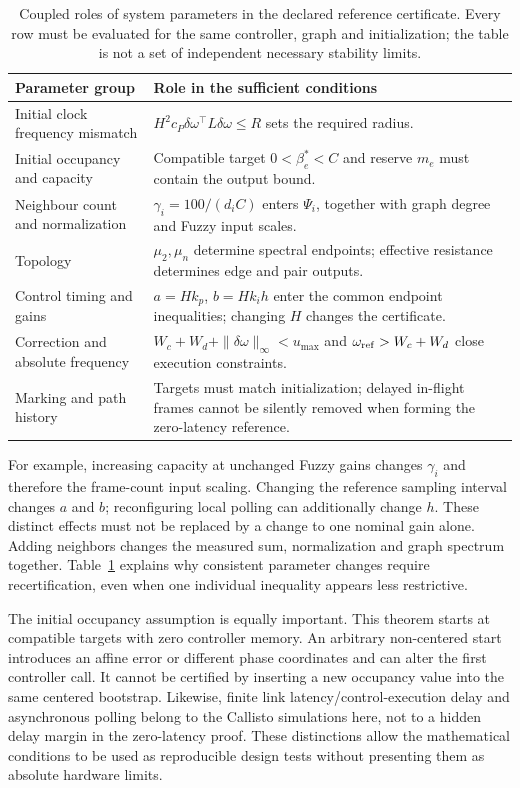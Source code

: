 \begin{table}[t]
\caption{Coupled roles of system parameters in the declared reference certificate.
Every row must be evaluated for the same controller, graph and initialization;
the table is not a set of independent necessary stability limits.}
\label{tab:parameter_roles}
\centering
\begin{tabular}{@{}lp{}@{}}\toprule
Parameter group & Role in the sufficient conditions\\\midrule
Initial clock frequency mismatch & $H^2c_P\delta\omega^\top L\delta\omega\le R$ sets the required radius.\\
Initial occupancy and capacity & Compatible target $0<\beta_e^*<C$ and reserve $m_e$ must contain the output bound.\\
Neighbour count and normalization & $\gamma_i=100/(d_iC)$ enters $\Psi_i$, together with graph degree and Fuzzy input scales.\\
Topology & $\mu_2,\mu_n$ determine spectral endpoints; effective resistance determines edge and pair outputs.\\
Control timing and gains & $a=Hk_p$, $b=Hk_ih$ enter the common endpoint inequalities; changing $H$ changes the certificate.\\
Correction and absolute frequency & $W_c+W_d+\|\delta\omega\|_\infty<u_{\max}$ and $\omega_{\rm ref}>W_c+W_d$ close execution constraints.\\
Marking and path history & Targets must match initialization; delayed in-flight frames cannot be silently removed when forming the zero-latency reference.\\\bottomrule
\end{tabular}
\end{table}

For example, increasing capacity at unchanged Fuzzy gains changes
$\gamma_i$ and therefore the frame-count input scaling. Changing
the reference sampling interval changes $a$ and $b$; reconfiguring
local polling can additionally change $h$. These distinct effects
must not be replaced by a change to one nominal gain alone. Adding neighbors
changes the measured sum, normalization and graph spectrum together.
Table~\ref{tab:parameter_roles} explains why consistent parameter
changes require recertification, even when one individual inequality
appears less restrictive.

The initial occupancy assumption is equally important. This theorem
starts at compatible targets with zero controller memory. An arbitrary
non-centered start introduces an affine error or different phase
coordinates and can alter the first controller call. It cannot be
certified by inserting a new occupancy value into the same centered
bootstrap. Likewise, finite link latency/control-execution delay and asynchronous
polling belong to the Callisto simulations here, not to a hidden
delay margin in the zero-latency proof. These distinctions allow the
mathematical conditions to be used as reproducible design tests
without presenting them as absolute hardware limits.

